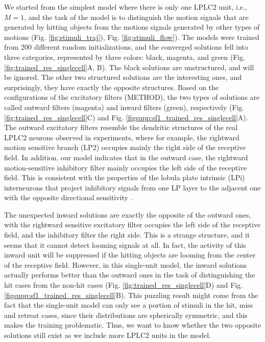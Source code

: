 \documentclass[pdftex,9pt,lineno]{elife}
\begin{document}
We started from the simplest model where there is only one LPLC2 unit, i.e., $M=1$, and the task of the model is to distinguish the motion signals that are generated by hitting objects from the motions signals generated by other types of motions (Fig. \ref{fig:stimuli_traj}), Fig. \ref{fig:stimuli_flow}). The models were trained from 200 different random initializations, and the converged solutions fell into three categories, represented by three colors: black, magenta, and green (Fig. \ref{fig:trained_res_singlecell}A, B). The black solutions are unstructured, and will be ignored. The other two structured solutions are the interesting ones, and surprisingly, they have exactly the opposite structures. Based on the configurations of the excitatory filters (METHOD), the two types of solutions are called outward filters (magenta) and inward filters (green), respectively (Fig. \ref{fig:trained_res_singlecell}C) and Fig. \ref{figsupp:sf1_trained_res_singlecell}A). The outward excitatory filters resemble the dendritic structures of the real LPLC2 neurons observed in experiments, where for example, the rightward motion sensitive branch (LP2) occupies mainly the right side of the receptive field. In addition, our model indicates that in the outward case, the rightward motion-sensitive inhibitory filter mainly occupies the left side of the receptive field. This is consistent with the properties of the lobula plate intrinsic (LPi) interneurons that project inhibitory signals from one LP layer to the adjacent one with the opposite directional sensitivity \citep{mauss2015neural,klapoetke2017ultra}.

The unexpected inward solutions are exactly the opposite of the outward ones, with the rightward sensitive excitatory filter occupies the left side of the receptive field, and the inhibitory filter the right side. This is a strange structure, and it seems that it cannot detect looming signals at all. In fact, the activity of this inward unit will be suppressed if the hitting objects are looming from the center of the receptive field. However, in this single-unit model, the inward solutions actually performs better than the outward ones in the task of distinguishing the hit cases from the non-hit cases (Fig. \ref{fig:trained_res_singlecell}D) and Fig. \ref{figsupp:sf1_trained_res_singlecell}B). This puzzling result might come from the fact that the single-unit model can only see a portion of stimuli in the hit, miss and retreat cases, since their distributions are spherically symmetric, and this makes the training problematic. Thus, we want to know whether the two opposite solutions still exist as we include more LPLC2 units in the model.
\end{document}
